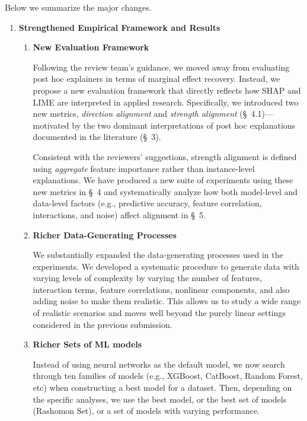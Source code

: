 \documentclass[11pt]{article}
\newcounter{se}[section]
\newcounter{reviewer}
\begin{document}
\begin{sf}
Below we summarize the major changes.

\begin{enumerate}
\item \textbf{Strengthened Empirical Framework and Results}

\begin{enumerate}
    \item \textbf{New Evaluation Framework}

    Following the review team’s guidance, we moved away from evaluating post hoc explainers in terms of marginal effect recovery. Instead, we propose a new evaluation framework that directly reflects how SHAP and LIME are interpreted in applied research. Specifically, we introduced two new metrics, \emph{direction alignment} and \emph{strength alignment} (\S~4.1)—motivated by the two dominant interpretations of post hoc explanations documented in the literature (\S~3).  


Consistent with the reviewers’ suggestions, strength alignment is defined using \emph{aggregate} feature importance rather than instance-level explanations. We have produced a new suite of experiments using these new metrics in \S~4 and systematically analyze how both model-level and data-level factors (e.g., predictive accuracy, feature correlation, interactions, and noise) affect alignment in \S~5.

\item \textbf{Richer Data-Generating Processes}

We substantially expanded the data-generating processes used in the experiments. We developed a systematic procedure to generate data with varying levels of complexity by varying the number of features, interaction terms, feature correlations, nonlinear components, and also adding noise to make them realistic. This allows us to study a wide range of realistic scenarios and moves well beyond the purely linear settings considered in the previous submission.

\item \textbf{Richer Sets of ML models}

Instead of using neural networks as the default model, we now search through ten families of models (e.g., XGBoost, CatBoost, Random Forest, etc) when constructing a best model for a dataset. Then, depending on the specific analyses, we use the best model, or the best set of models (Rashomon Set), or a set of models with varying performance.
\end{enumerate}


\end{enumerate}
\end{sf}
\end{document}
